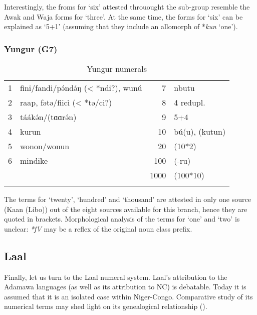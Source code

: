 Interestingly, the froms for ‘six’ attested throuought the sub-group resemble the Awak and Waja forms for ‘three’. At the same time, the forms for ‘six’ can be explained as ‘5+1’ (assuming that they include an allomorph of *\textit{kun} ‘one’).

\subsubsection{Yungur (G7)}%
\begin{table}
\caption{\label{tab:3:115}Yungur numerals}


\begin{tabularx}{\textwidth}{llrX}
\lsptoprule

1 & fini/fandi/p{\'{ə}}nd{\'{ə}}ŋ (< *ndi?), wun{\'{u}} & 7 & nbutu\\
2 & raap, fətə/fiicì (< *tə/ci?) & 8 & 4 redupl.\\
3 & táák{\'{ə}}n/(tɑɑr{\'{ə}}n) & 9 & 5+4\\
4 & kurun & 10 & b{\'{u}}(u), (kutun)\\
5 & wonon/wonun & 20 & (10*2)\\
6 & mindike & 100 & (-ru)\\
&  & 1000 & (100*10)\\
\lspbottomrule
\end{tabularx}
\end{table}

The terms for ‘twenty’, ‘hundred’ and ‘thousand’ are attested in only one source (Kaan (Libo)) out of the eight sources available for this branch, hence they are quoted in brackets. Morphological analysis of the terms for ‘one’ and ‘two’ is unclear: \textit{*fV} may be a reflex of the original noun class prefix.

\clearpage
\subsection{Laal}%
Finally, let us turn to the Laal numeral system. Laal’s attribution to the Adamawa languages (as well as its attribution to NC) is debatable. Today it is assumed that it is an isolated case within Niger-Congo. Comparative study of its numerical terms may shed light on its genealogical relationship (). 

